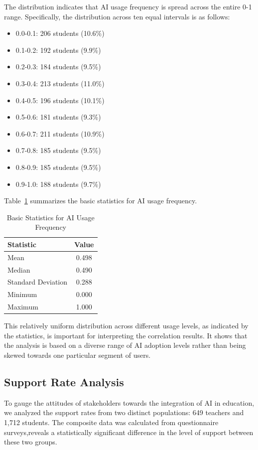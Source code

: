 \documentclass[manuscript,screen,review]{acmart}
\begin{document}
The distribution indicates that AI usage frequency is spread across the entire 0-1 range. Specifically, the distribution across ten equal intervals is as follows:
\begin{itemize}
  \item 0.0-0.1: 206 students (10.6\%)
  \item 0.1-0.2: 192 students (9.9\%)
  \item 0.2-0.3: 184 students (9.5\%)
  \item 0.3-0.4: 213 students (11.0\%)
  \item 0.4-0.5: 196 students (10.1\%)
  \item 0.5-0.6: 181 students (9.3\%)
  \item 0.6-0.7: 211 students (10.9\%)
  \item 0.7-0.8: 185 students (9.5\%)
  \item 0.8-0.9: 185 students (9.5\%)
  \item 0.9-1.0: 188 students (9.7\%)
\end{itemize}

Table~\ref{tab:ai_usage_stats} summarizes the basic statistics for AI usage frequency.

\begin{table}[H]
\centering
\caption{Basic Statistics for AI Usage Frequency}
\label{tab:ai_usage_stats}
\begin{tabular}{@{}lc@{}}
\toprule
Statistic & Value \\
\midrule
Mean & 0.498 \\
Median & 0.490 \\
Standard Deviation & 0.288 \\
Minimum & 0.000 \\
Maximum & 1.000 \\
\bottomrule
\end{tabular}
\end{table}

This relatively uniform distribution across different usage levels, as indicated by the statistics, is important for interpreting the correlation results. It shows that the analysis is based on a diverse range of AI adoption levels rather than being skewed towards one particular segment of users.


\subsection{Support Rate Analysis}

To gauge the attitudes of stakeholders towards the integration of AI in education, we analyzed the support rates from two distinct populations: 649 teachers and 1,712 students. The composite data was calculated from questionnaire surveys,reveals a statistically significant difference in the level of support between these two groups.
\end{document}
